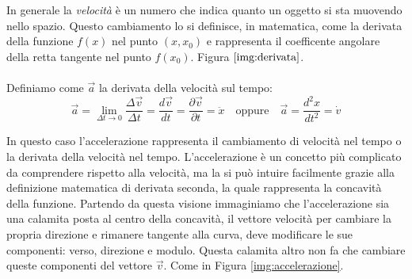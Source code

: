 In generale la \textit{velocità} è un numero che indica quanto un oggetto si sta muovendo nello spazio. Questo cambiamento lo si definisce, in matematica, come la derivata della funzione $f(x)$ nel punto $(x,x_0)$ e rappresenta il coefficente angolare della retta tangente nel punto $f(x_0)$. Figura $\ref{img:derivata}$.
\paragraph{}
Definiamo come $\vec{a}$ la derivata della velocità sul tempo:
\begin{equation}
    \vec{a} = \lim_{\Delta t\to0}\frac{\Delta\vec{v}}{\Delta t}  =  \frac{d\vec{v}}{dt} = \frac{\partial \vec{v}}{\partial t} = \ddot{x} \quad \text{oppure} \quad \vec{a} = \frac{d^2x}{dt^2}  = \dot{v}
\end{equation}

In questo caso l'accelerazione rappresenta il cambiamento di velocità nel tempo o la derivata della velocità nel tempo.
L'accelerazione è un concetto più complicato da comprendere rispetto alla velocità, ma la si può intuire facilmente grazie alla definizione matematica di derivata seconda, la quale rappresenta la concavità della funzione. Partendo da questa visione immaginiamo che l'accelerazione sia una calamita posta al centro della concavità, il vettore velocità per cambiare la propria direzione e rimanere tangente alla curva, deve modificare le sue componenti: verso, direzione e modulo. Questa calamita altro non fa che cambiare queste componenti del vettore $\vec{v} $. Come in Figura \ref{img:accelerazione}.



